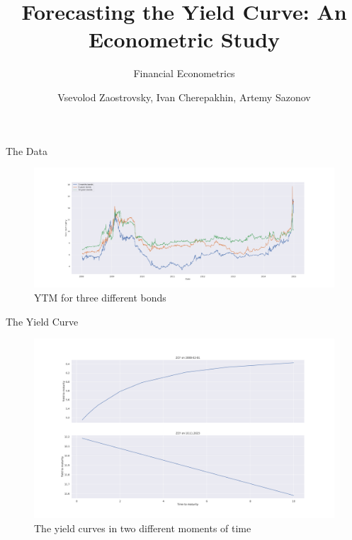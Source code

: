 \documentclass[aspectratio=169]{beamer}
\title{Forecasting the Yield Curve: An Econometric Study}
\subtitle{Financial Econometrics}
\author{Vsevolod Zaostrovsky, Ivan Cherepakhin, Artemy Sazonov}
\institute{Vega Institute Foundation}
\begin{document}
\maketitle

\begin{frame}{The Data}
    \begin{figure}
        \includegraphics[scale=0.21]{fig/YTMp.pdf}
        \caption{YTM for three different bonds}
        \label{fig:YTMp}
    \end{figure}
\end{frame}

    \begin{frame}{The Yield Curve}
        \begin{figure}
            \includegraphics[scale=0.21]{fig/ZCYp.pdf}
            \caption{The yield curves in two different moments of time}
            \label{fig:ZCY}
        \end{figure}
    \end{frame}
\end{document}
